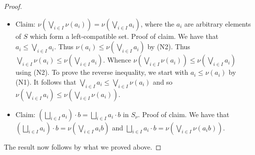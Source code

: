 \documentclass[10pt,a4paper]{amsart}
\begin{document}
\begin{proof}
\begin{itemize}
\item Claim: $\nu \left( \bigvee_{i \in I} \nu (a_{i})  \right) = \nu (\bigvee_{i \in I} a_{i})$,
where the $a_{i}$ are arbitrary elements of $S$ which form a left-compatible set.
Proof of claim.
We have that $a_{i} \leq \bigvee_{i \in I} a_{i}$.
Thus  $\nu (a_{i}) \leq \nu \left( \bigvee_{i \in I} a_{i} \right)$ by (N2).
Thus  $\bigvee_{i \in I} \nu (a_{i}) \leq \nu \left( \bigvee_{i \in I} a_{i} \right)$.
Whence  $\nu \left(  \bigvee_{i \in I} \nu (a_{i}) \right) \leq \nu \left( \bigvee_{i \in I} a_{i} \right)$
using (N2).
To prove the reverse inequality,
we start with $a_{i} \leq \nu (a_{i})$ by (N1).
It follows that $\bigvee_{i \in I} a_{i} \leq \bigvee_{i \in I} \nu (a_{i})$ and so
$\nu \left( \bigvee_{i \in I} a_{i} \right) \leq \nu \left( \bigvee_{i \in I} \nu (a_{i}) \right)$.

\item Claim: $\left( \bigsqcup_{i \in I} a_{i} \right) \cdot b = \bigsqcup_{i \in I} a_{i} \cdot b$
in $S_{\nu}$.
Proof of claim.
We have that 
$\left( \bigsqcup_{i \in I} a_{i} \right) \cdot b = \nu \left( \bigvee_{i \in I} a_{i}b \right)$
and
$\bigsqcup_{i \in I} a_{i} \cdot b = \nu \left( \bigvee_{i \in I} \nu (a_{i}b)\right)$.
\end{itemize}

The result now follows by what we proved above.
\end{proof}
\end{document}
